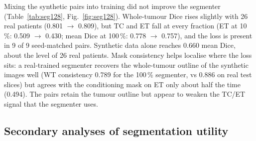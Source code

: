 \documentclass[10pt,a4paper]{article}
\begin{document}
Mixing the synthetic pairs into training did not improve the segmenter (Table~\ref{tab:seg128}, Fig.~\ref{fig:seg128}). Whole-tumour Dice rises slightly with 26 real patients (0.801 $\to$ 0.809), but TC and ET fall at every fraction (ET at 10\,\%: 0.509 $\to$ 0.430; mean Dice at 100\,\%: 0.778 $\to$ 0.757), and the loss is present in 9 of 9 seed-matched pairs. Synthetic data alone reaches 0.660 mean Dice, about the level of 26 real patients. Mask consistency helps localise where the loss sits: a real-trained segmenter recovers the whole-tumour outline of the synthetic images well (WT consistency 0.789 for the 100\,\% segmenter, vs 0.886 on real test slices) but agrees with the conditioning mask on ET only about half the time (0.494). The pairs retain the tumour outline but appear to weaken the TC/ET signal that the segmenter uses.

\subsection{Secondary analyses of segmentation utility}
\label{sec:secondary}
\begin{table}[t]
  \centering\small
  \caption{Secondary analyses at 128\,px: change in mean test Dice relative to real only, seed-matched, three seeds (per-region changes for the two decisive rows). The control row pre-trains for the same 20 extra epochs on the real slices.}
  \label{tab:secondary}
\end{table}
\end{document}
